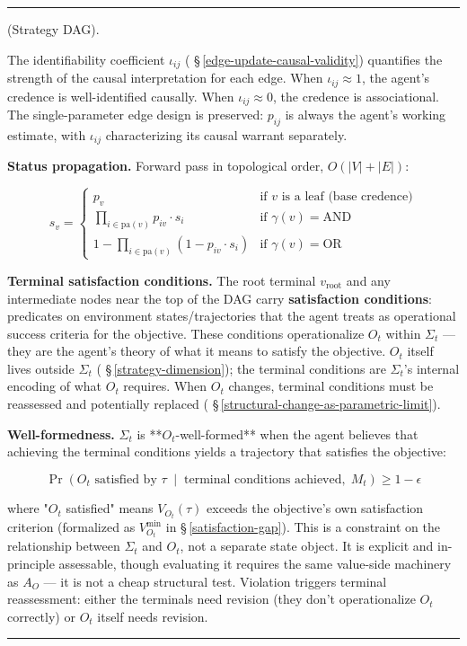 \documentclass[11pt,oneside]{article}
\newcounter{claim}[section]
\renewcommand{\theclaim}{\thesection.\arabic{claim}}
\newenvironment{segment}[2]{%
  \refstepcounter{claim}%
  \bigskip\noindent\hrule\smallskip
  \noindent{\bfseries #1~\theclaim}\enskip(#2).\par\smallskip
  \noindent\ignorespaces
}{%
  \par\smallskip\noindent\hrule\bigskip
}
\newenvironment{definition}[1][]{\begin{segment}{Definition}{#1}}{\end{segment}}
\begin{document}
\begin{definition}[Strategy DAG]
The identifiability coefficient $\iota_{ij}$ ( \S\,\ref{edge-update-causal-validity}) quantifies the strength of the causal interpretation for each edge. When $\iota_{ij} \approx 1$, the agent's credence is well-identified causally. When $\iota_{ij} \approx 0$, the credence is associational. The single-parameter edge design is preserved: $p_{ij}$ is always the agent's working estimate, with $\iota_{ij}$ characterizing its causal warrant separately.

\textbf{Status propagation.} Forward pass in topological order, $O(\lvert V \rvert + \lvert E \rvert)$:

$$s_v = \begin{cases} p_v & \text{if } v \text{ is a leaf (base credence)} \\ \prod_{i \in \text{pa}(v)} p_{iv} \cdot s_i & \text{if } \gamma(v) = \text{AND} \\ 1 - \prod_{i \in \text{pa}(v)} (1 - p_{iv} \cdot s_i) & \text{if } \gamma(v) = \text{OR} \end{cases}$$

\textbf{Terminal satisfaction conditions.} The root terminal $v_\text{root}$ and any intermediate nodes near the top of the DAG carry \textbf{satisfaction conditions}: predicates on environment states/trajectories that the agent treats as operational success criteria for the objective. These conditions operationalize $O_t$ within $\Sigma_t$ — they are the agent's theory of what it means to satisfy the objective. $O_t$ itself lives outside $\Sigma_t$ ( \S\,\ref{strategy-dimension}); the terminal conditions are $\Sigma_t$'s internal encoding of what $O_t$ requires. When $O_t$ changes, terminal conditions must be reassessed and potentially replaced ( \S\,\ref{structural-change-as-parametric-limit}).

\textbf{Well-formedness.} $\Sigma_t$ is **$O_t$-well-formed** when the agent believes that achieving the terminal conditions yields a trajectory that satisfies the objective:

$$\Pr\!\left(O_t \text{ satisfied by } \tau \;\middle\vert\; \text{terminal conditions achieved},\; M_t\right) \geq 1 - \epsilon$$

where "$O_t$ satisfied" means $V_{O_t}(\tau)$ exceeds the objective's own satisfaction criterion (formalized as $V_{O_t}^{\min}$ in \S\,\ref{satisfaction-gap}). This is a constraint on the relationship between $\Sigma_t$ and $O_t$, not a separate state object. It is explicit and in-principle assessable, though evaluating it requires the same value-side machinery as $A_O$ — it is not a cheap structural test. Violation triggers terminal reassessment: either the terminals need revision (they don't operationalize $O_t$ correctly) or $O_t$ itself needs revision.


\end{definition}
\end{document}
